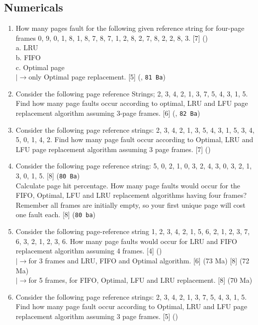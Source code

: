 \documentclass[12pt]{article}
\newcommand{\lb}{\\$\left|\rightarrow\right.$}
\begin{document}
	\subsection{Numericals}
		\begin{enumerate}
			\item How many pages fault for the following given reference string for four-page frames 0, 9, 0, 1, 8, 1, 8, 7, 8, 7, 1, 2, 8, 2, 7, 8, 2, 2, 8, 3. \hfill [7] ()\\
			a. LRU\\
			b. FIFO\\
			c. Optimal page
			\lb only Optimal page replacement. \hfill [5] (, \texttt{81 Ba})

			\item Consider the following page reference Strings; 2, 3, 4, 2, 1, 3, 7, 5, 4, 3, 1, 5. Find how many page faults occur according to optimal, LRU and LFU page replacement algorithm assuming 3-page frames. \hfill [6] (, \texttt{82 Ba})
			
			\item Consider the following page reference strings: 2, 3, 4, 2, 1, 3, 5, 4, 3, 1, 5, 3, 4, 5, 0, 1, 4, 2. Find how many page fault occur according to Optimal, LRU and LFU page replacement algorithm assuming 3 page frames. \hfill [7] ()

			\item Consider the following page reference string: 5, 0, 2, 1, 0, 3, 2, 4, 3, 0, 3, 2, 1, 3, 0, 1, 5. \hfill [8] (\texttt{80 Ba})\\
			Calculate page hit percentage. How many page faults would occur for the FIFO, Optimal, LFU and LRU replacement algorithms having four frames? Remember all frames are initially empty, so your first unique page will cost one fault each. \hfill [8] (\texttt{80 ba})

			\item Consider the following page-reference string 1, 2, 3, 4, 2, 1, 5, 6, 2, 1, 2, 3, 7, 6, 3, 2, 1, 2, 3, 6. How many page faults would occur for LRU and FIFO replacement algorithm assuming 4 frames. \hfill [4] ()
			\lb for 3 frames and LRU, FIFO and Optimal algorithm. \hfill [6] (73 Ma) [8] (72 Ma)
			\lb for 5 frames, for FIFO, Optimal, LFU and LRU replacement. \hfill [8] (70 Ma)

			\item Consider the following page reference strings: 2, 3, 4, 2, 1, 3, 7, 5, 4, 3, 1, 5. Find how many page fault occur according to Optimal, LRU and LFU page replacement algorithm assuming 3 page frames. \hfill [5] ()


\end{enumerate}
\end{document}
